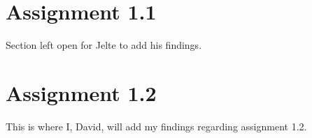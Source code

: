 \documentclass[12pt]{article}
\begin{document}
\maketitle
\section{Assignment 1.1}
Section left open for Jelte to add his findings.
\section{Assignment 1.2}
This is where I, David, will add my findings regarding assignment 1.2.
\end{document}
